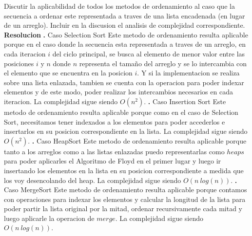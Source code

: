 \documentclass[10pt,a4paper]{article}
\begin{document}
Discutir la aplicabilidad de todos los metodos de ordenamiento al caso que la secuencia a ordenar este representada a traves de una lista encadenada (en lugar de un arreglo). Incluir en la discusion el analisis de complejidad correspondiente. 
\newline
\newline
\textbf{Resolucion}
\newline
\newline
\textbf{.} Caso Selection Sort
\newline
\newline
Este metodo de ordenamiento resulta aplicable porque en el caso donde la secuencia esta representada a traves de un arreglo, en cada iteracion $i$ del ciclo principal, se busca al elemento de menor valor entre las posiciones $i$ y $n$ donde $n$ representa el tamaño del arreglo y se lo intercambia con el elemento que se encuentra en la posicion $i$. Y si la implementacion se realiza sobre una lista enlazada, tambien se cuenta con la operacion para poder indexar elementos y de este modo, poder realizar los intercambios necesarios en cada iteracion. La complejidad sigue siendo $O(n^{2})$. 
\newline
\newline
\textbf{.} Caso Insertion Sort
\newline
\newline
Este metodo de ordenamiento resulta aplicable porque como en el caso de Selection Sort, necesitamos tener indexados a los elementos para poder accederlos e insertarlos en su posicion correspondiente en la lista. La complejidad sigue siendo $O(n^{2})$.
\newline
\newline
\textbf{.} Caso HeapSort
\newline
\newline
Este metodo de ordenamiento resulta aplicable porque tanto a los arreglos como a las listas enlazadas puedo representarlas como $heaps$ para poder aplicarles el Algoritmo de Floyd en el primer lugar y luego ir insertando los elementos en la lista en su posicion correspondiente a medida que los voy desencolando del heap. La complejidad sigue siendo $O(n~log(n))$.
\newline
\newline
\textbf{.} Caso MergeSort
\newline
\newline
Este metodo de ordenamiento resulta aplicable porque contamos con operaciones para indexar los elementos y calcular la longitud de la lista para poder partir la lista original por la mitad, ordenar recursivamente cada mitad y luego aplicarle la operacion de $merge$. La complejidad sigue siendo $O(n~log(n))$.
\end{document}
